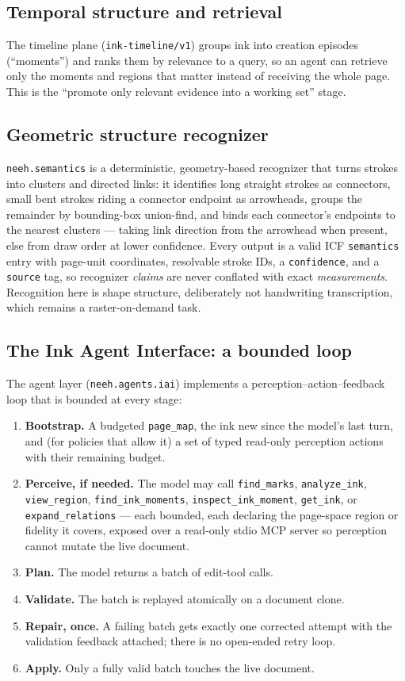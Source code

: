 \documentclass[11pt]{article}
\newcommand{\code}[1]{\texttt{#1}}
\begin{document}
\subsection{Temporal structure and retrieval}
The timeline plane (\code{ink-timeline/v1}) groups ink into creation episodes
(``moments'') and ranks them by relevance to a query, so an agent can retrieve
only the moments and regions that matter instead of receiving the whole page.
This is the ``promote only relevant evidence into a working set'' stage.

\subsection{Geometric structure recognizer}
\code{neeh.semantics} is a deterministic, geometry-based recognizer that turns
strokes into clusters and directed links: it identifies long straight strokes as
connectors, small bent strokes riding a connector endpoint as arrowheads, groups
the remainder by bounding-box union-find, and binds each connector's endpoints to
the nearest clusters --- taking link direction from the arrowhead when present,
else from draw order at lower confidence. Every output is a valid ICF
\code{semantics} entry with page-unit coordinates, resolvable stroke IDs, a
\code{confidence}, and a \code{source} tag, so recognizer \emph{claims} are never
conflated with exact \emph{measurements}. Recognition here is shape structure,
deliberately not handwriting transcription, which remains a raster-on-demand
task.

\subsection{The Ink Agent Interface: a bounded loop}
The agent layer (\code{neeh.agents.iai}) implements a
perception--action--feedback loop that is bounded at every stage:

\begin{enumerate}[leftmargin=1.4em, itemsep=1pt]
\item \textbf{Bootstrap.} A budgeted \code{page\_map}, the ink new since the
  model's last turn, and (for policies that allow it) a set of typed read-only
  perception actions with their remaining budget.
\item \textbf{Perceive, if needed.} The model may call \code{find\_marks},
  \code{analyze\_ink}, \code{view\_region}, \code{find\_ink\_moments},
  \code{inspect\_ink\_moment}, \code{get\_ink}, or \code{expand\_relations} ---
  each bounded, each declaring the page-space region or fidelity it covers,
  exposed over a read-only stdio MCP server so perception cannot mutate the live
  document.
\item \textbf{Plan.} The model returns a batch of edit-tool calls.
\item \textbf{Validate.} The batch is replayed atomically on a document clone.
\item \textbf{Repair, once.} A failing batch gets exactly one corrected attempt
  with the validation feedback attached; there is no open-ended retry loop.
\item \textbf{Apply.} Only a fully valid batch touches the live document.
\end{enumerate}
\end{document}
